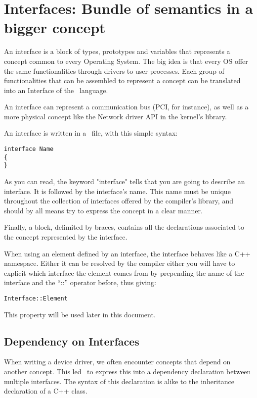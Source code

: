 \documentclass[american]{rtxreport}
\begin{document}
\section{Interfaces: Bundle of semantics in a bigger concept}

An interface is a block of types, prototypes and variables that represents
a concept common to every Operating System. The big idea is that every
OS offer the same functionalities through drivers to user processes. Each
group of functionalities that can be assembled to represent a concept can be
translated into an Interface of the \rtx\ language.

An interface can represent a communication bus (PCI, for instance), as well as
a more physical concept like the Network driver API in the kernel's library.

An interface is written in a \rtx\ file, with this simple syntax:
\begin{lstlisting}
interface Name
{
}
\end{lstlisting}

As you can read, the keyword "interface" tells that you are going to describe
an interface. It is followed by the interface's name. This name must be unique
throughout the collection of interfaces offered by the compiler's library, and
should by all means try to express the concept in a clear manner.

Finally, a block, delimited by braces, contains all the declarations associated
to the concept represented by the interface.

When using an element defined by an interface, the interface behaves like a
C++ namespace. Either it can be resolved by the compiler either you will have
to explicit which interface the element comes from by prepending the name of
the interface and the ``::'' operator before, thus giving:
\begin{lstlisting}
Interface::Element
\end{lstlisting}
This property will be used later in this document.


\subsection{Dependency on Interfaces}

When writing a device driver, we often encounter concepts that depend on
another concept. This led \rtx\ to express this into a dependency declaration
between multiple interfaces. The syntax of this declaration is alike to the
inheritance declaration of a C++ class.
\end{document}
